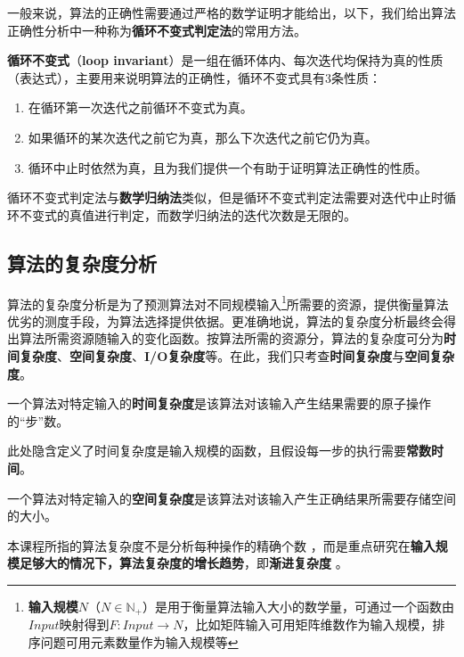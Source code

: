 \documentclass[12pt,a4paper,violet]{bbe}
\begin{document}
一般来说，算法的正确性需要通过严格的数学证明才能给出，以下，我们给出算法正确性分析中一种称为\textbf{循环不变式判定法}的常用方法。
\begin{theorem}
	\textbf{循环不变式}（\textbf{loop invariant}）是一组在循环体内、每次迭代均保持为真的性质（表达式），主要用来说明算法的正确性，循环不变式具有3条性质：
	\begin{enumerate}
		\item 在循环第一次迭代之前循环不变式为真。
		\item 如果循环的某次迭代之前它为真，那么下次迭代之前它仍为真。
		\item 循环中止时依然为真，且为我们提供一个有助于证明算法正确性的性质。
	\end{enumerate}
\end{theorem}
\begin{remark}
	循环不变式判定法与\textbf{数学归纳法}类似，但是循环不变式判定法需要对迭代中止时循环不变式的真值进行判定，而数学归纳法的迭代次数是无限的。
\end{remark}

\subsection{算法的复杂度分析\label{1.3.2}}
算法的复杂度分析是为了预测算法对不同规模输入\footnote{\textbf{输入规模}$N$（$N\in \mathbb{N}_+$）是用于衡量算法输入大小的数学量，可通过一个函数由$Input$映射得到$F:Input\rightarrow N$，比如矩阵输入可用矩阵维数作为输入规模，排序问题可用元素数量作为输入规模等}所需要的资源，提供衡量算法优劣的测度手段，为算法选择提供依据。更准确地说，算法的复杂度分析最终会得出算法所需资源随输入的变化函数。按算法所需的资源分，算法的复杂度可分为\textbf{时间复杂度}、\textbf{空间复杂度}、\textbf{I/O复杂度}等。在此，我们只考查\textbf{时间复杂度}与\textbf{空间复杂度}。

\begin{definition}
	一个算法对特定输入的\textbf{时间复杂度}是该算法对该输入产生结果需要的原子操作的“步”数。
\end{definition}
\begin{remark}
	此处隐含定义了时间复杂度是输入规模的函数，且假设每一步的执行需要\textbf{常数时间}。
\end{remark}
\begin{definition}
一个算法对特定输入的\textbf{空间复杂度}是该算法对该输入产生正确结果所需要存储空间的大小。
\end{definition}
\begin{remark}
	本课程所指的算法复杂度不是分析每种操作的精确个数 ，而是重点研究在\textbf{输入规模足够大的情况下，算法复杂度的增长趋势}，即\textbf{渐进复杂度} 。
\end{remark}
\end{document}
